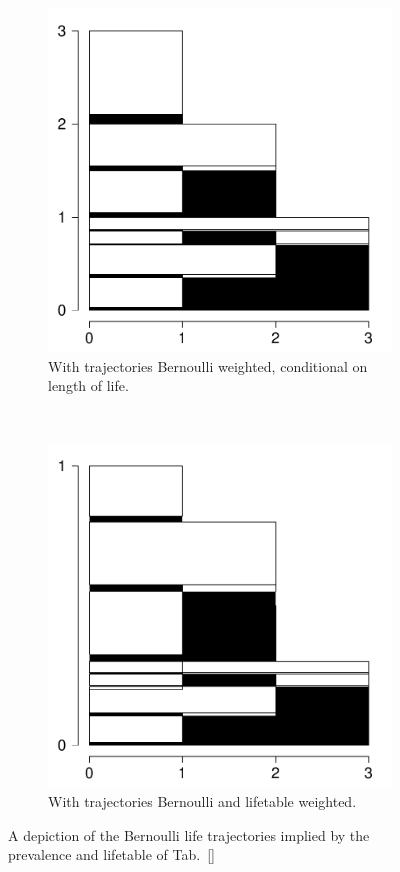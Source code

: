 \documentclass{bmcart}
\begin{document}
\begin{figure}
     \begin{subfigure}[b]{0.3\textwidth}
        \includegraphics[width=\textwidth]{Figures/BernCondTrajProbs.pdf}
        \caption{With trajectories Bernoulli weighted, conditional on length of life.}
        \label{fig:b3}
    \end{subfigure}
    ~ 
    \begin{subfigure}[b]{0.3\textwidth}
        \includegraphics[width=\textwidth]{Figures/BernTrajProbsWeighted}
        \caption{With trajectories Bernoulli and lifetable weighted.}
        \label{fig:b4}
    \end{subfigure}
    \caption{A depiction of the Bernoulli life trajectories implied by the prevalence and lifetable of Tab.~\ref{}}\label{fig:bernexplain}
\end{figure}
\end{document}

